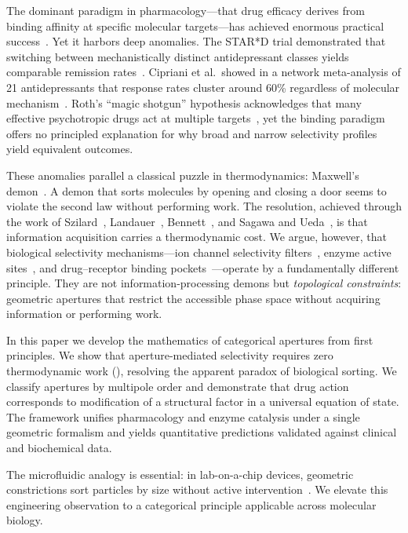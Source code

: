\documentclass[10pt,twocolumn]{article}
\theoremstyle{definition}
\theoremstyle{remark}
\begin{document}
The dominant paradigm in pharmacology---that drug efficacy derives from
binding affinity at specific molecular targets---has achieved enormous
practical success~\cite{Kenakin2004,Stahl2021}.  Yet it harbors deep
anomalies.  The STAR*D trial demonstrated that switching between
mechanistically distinct antidepressant classes yields comparable
remission rates~\cite{Rush2006}.  Cipriani et al.\ showed in a
network meta-analysis of 21 antidepressants that response rates cluster
around 60\% regardless of molecular mechanism~\cite{Cipriani2018}.
Roth's ``magic shotgun'' hypothesis acknowledges that many effective
psychotropic drugs act at multiple targets~\cite{Roth2004}, yet the
binding paradigm offers no principled explanation for why broad and
narrow selectivity profiles yield equivalent outcomes.

These anomalies parallel a classical puzzle in thermodynamics:
Maxwell's demon~\cite{Maxwell1871}.  A demon that sorts molecules
by opening and closing a door seems to violate the second law without
performing work.  The resolution, achieved through the work of
Szilard~\cite{Szilard1929}, Landauer~\cite{Landauer1961},
Bennett~\cite{Bennett1982}, and Sagawa and Ueda~\cite{Sagawa2010},
is that information acquisition carries a thermodynamic cost.
We argue, however, that biological selectivity mechanisms---ion
channel selectivity filters~\cite{Doyle1998,Hille2001}, enzyme
active sites~\cite{Wolfenden2001,Klinman2013}, and drug--receptor
binding pockets~\cite{Owens1997}---operate by a fundamentally different
principle.  They are not information-processing demons but
\emph{topological constraints}: geometric apertures that restrict
the accessible phase space without acquiring information or performing work.

In this paper we develop the mathematics of categorical apertures
from first principles.  We show that aperture-mediated selectivity
requires zero thermodynamic work (), resolving
the apparent paradox of biological sorting.  We classify apertures
by multipole order and demonstrate that drug action corresponds to
modification of a structural factor in a universal equation of state.
The framework unifies pharmacology and enzyme catalysis under a
single geometric formalism and yields quantitative predictions
validated against clinical and biochemical data.

The microfluidic analogy is essential: in lab-on-a-chip devices,
geometric constrictions sort particles by size without active
intervention~\cite{Whitesides2006,Stone2004}.  We elevate this
engineering observation to a categorical principle applicable
across molecular biology.
\end{document}

